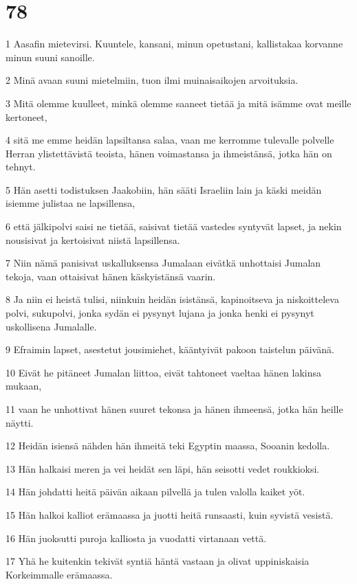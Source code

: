 \chapter{78}

\par 1 Aasafin mietevirsi. Kuuntele, kansani, minun opetustani, kallistakaa korvanne minun suuni sanoille.
\par 2 Minä avaan suuni mietelmiin, tuon ilmi muinaisaikojen arvoituksia.
\par 3 Mitä olemme kuulleet, minkä olemme saaneet tietää ja mitä isämme ovat meille kertoneet,
\par 4 sitä me emme heidän lapsiltansa salaa, vaan me kerromme tulevalle polvelle Herran ylistettävistä teoista, hänen voimastansa ja ihmeistänsä, jotka hän on tehnyt.
\par 5 Hän asetti todistuksen Jaakobiin, hän sääti Israeliin lain ja käski meidän isiemme julistaa ne lapsillensa,
\par 6 että jälkipolvi saisi ne tietää, saisivat tietää vastedes syntyvät lapset, ja nekin nousisivat ja kertoisivat niistä lapsillensa.
\par 7 Niin nämä panisivat uskalluksensa Jumalaan eivätkä unhottaisi Jumalan tekoja, vaan ottaisivat hänen käskyistänsä vaarin.
\par 8 Ja niin ei heistä tulisi, niinkuin heidän isistänsä, kapinoitseva ja niskoitteleva polvi, sukupolvi, jonka sydän ei pysynyt lujana ja jonka henki ei pysynyt uskollisena Jumalalle.
\par 9 Efraimin lapset, asestetut jousimiehet, kääntyivät pakoon taistelun päivänä.
\par 10 Eivät he pitäneet Jumalan liittoa, eivät tahtoneet vaeltaa hänen lakinsa mukaan,
\par 11 vaan he unhottivat hänen suuret tekonsa ja hänen ihmeensä, jotka hän heille näytti.
\par 12 Heidän isiensä nähden hän ihmeitä teki Egyptin maassa, Sooanin kedolla.
\par 13 Hän halkaisi meren ja vei heidät sen läpi, hän seisotti vedet roukkioksi.
\par 14 Hän johdatti heitä päivän aikaan pilvellä ja tulen valolla kaiket yöt.
\par 15 Hän halkoi kalliot erämaassa ja juotti heitä runsaasti, kuin syvistä vesistä.
\par 16 Hän juoksutti puroja kalliosta ja vuodatti virtanaan vettä.
\par 17 Yhä he kuitenkin tekivät syntiä häntä vastaan ja olivat uppiniskaisia Korkeimmalle erämaassa.
